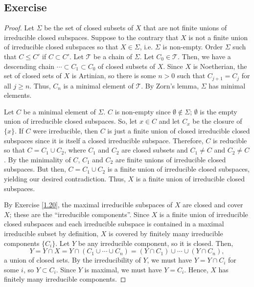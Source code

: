 \subsection{Exercise}\label{6.7}

\begin{proof}
Let $\Sigma$ be the set of closed subsets of $X$ that are not finite unions of irreducible closed subspaces. Suppose to the contrary that $X$
is not a finite union of irreducible closed subspaces so that $X \in \Sigma$, i.e. $\Sigma$ is non-empty. Order $\Sigma$ such that $C \le C'$
if $C \subset C'$. Let $\mathcal{T}$ be a chain of $\Sigma$. Let $C_0 \in \mathcal{T}$. Then, we have a descending chain $\cdots \subset C_1 \subset C_0$ 
of closed subsets of $X$. Since $X$ is Noetherian, the set of closed sets of $X$ is Artinian, so there is some $n > 0$ such that $C_{j+1} = C_j$ for all 
$j \ge n$. Thus, $C_n$ is a minimal element of $\mathcal{T}$. By Zorn's lemma, $\Sigma$ has minimal elements.

Let $C$ be a minimal element of $\Sigma$. $C$ is non-empty since $\emptyset \not\in \Sigma$; $\emptyset$ is the empty union of irreducible closed subspaces.
So, let $x \in C$ and let $C_x$ be the closure of $\{x\}$. If $C$ were irreducible, then $C$ is just a finite union of closed irreducible closed subspaces
since it is itself a closed irreducible subspace. Therefore, $C$ is reducible so that $C = C_1 \cup C_2$, where $C_1$ and $C_2$ are closed subsets and 
$C_1 \neq C$ and $C_2 \neq C$. By the minimality of $C$, $C_1$ and $C_2$ are finite unions of irreducible closed subspaces. But then, $C = C_1 \cup C_2$
is a finite union of irreducible closed subspaces, yielding our desired contradiction. Thus, $X$ is a finite union of irreducible closed subspaces.

By Exercise \ref{1.20}, the maximal irreducible subspaces of $X$ are closed and cover $X$; these are the ``irreducible components''. Since $X$ is a finite
union of irreducible closed subspaces and each irreducible subspace is contained in a maximal irreducible subset by definition, $X$ is covered by finitely 
many irreducible components $\{C_i\}$. Let $Y$ be any irreducible component, so it is closed. Then,
$$Y = Y \cap X = Y \cap (C_1 \cup \cdots \cup C_n) = (Y \cap C_1) \cup \cdots \cup (Y \cap C_n),$$
a union of closed sets. By the irreducibility of $Y$, we must have $Y = Y \cap C_i$ for some $i$, so $Y \subset C_i$. Since $Y$ is maximal,
we must have $Y = C_i$. Hence, $X$ has finitely many irreducible components.
\end{proof}

